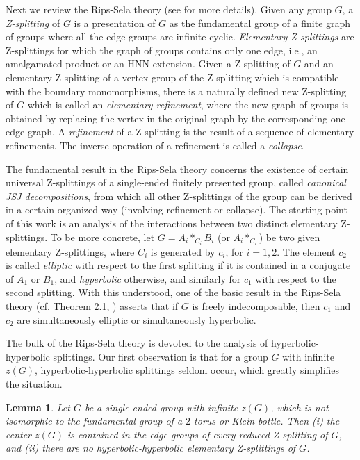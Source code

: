 \documentclass[11pt]{amsart}
\theoremstyle{plain}
\numberwithin{theorem}{section}
\newtheorem{lemma}[theorem]{Lemma}
\theoremstyle{definition}
\begin{document}
Next we review the Rips-Sela theory (see \cite{RipS} for more details). Given any group $G$,
a {\it Z-splitting} of $G$ is a presentation of $G$ as the fundamental group of a finite graph
of groups where all the edge groups are infinite cyclic. {\it Elementary Z-splittings} are
Z-splittings for which the graph of groups contains only one edge, i.e., an amalgamated 
product or an HNN extension. Given a Z-splitting of $G$ and an elementary Z-splitting of
a vertex group of the Z-splitting which is compatible with the boundary monomorphisms, there is a
naturally defined new Z-splitting of $G$ which is called an {\it elementary refinement}, where
the new graph of groups is obtained by replacing the vertex in the original graph by the 
corresponding one edge graph.  A {\it refinement} of a Z-splitting is the result of a sequence 
of elementary refinements. The inverse operation of a refinement is called a {\it collapse}. 

The fundamental result in the Rips-Sela theory concerns the existence of certain universal 
Z-splittings of a single-ended finitely presented group, called {\it canonical JSJ decompositions}, 
from which all other Z-splittings of the group can be derived in a certain organized way (involving
refinement or collapse). 
The starting point of this work is an analysis of the interactions between two distinct elementary 
Z-splittings. To be more concrete, let $G=A_i\ast_{C_i} B_i$ (or $A_i\ast_{C_i}$) be two given 
elementary Z-splittings, where $C_i$ is generated by $c_i$, for $i=1,2$. The element $c_2$ is 
called {\it elliptic} with respect to the first splitting if it is contained in a conjugate of $A_1$ or $B_1$, 
and {\it hyperbolic} otherwise, and similarly for $c_1$ with respect to the second splitting. With this
understood, one of the basic result in the Rips-Sela theory (cf. Theorem 2.1, \cite{RipS}) asserts 
that if $G$ is freely indecomposable, then $c_1$ and $c_2$ are simultaneously elliptic or 
simultaneously hyperbolic. 

The bulk of the Rips-Sela theory is devoted to the analysis of hyperbolic-hyperbolic splittings.
Our first observation is that for a group $G$ with infinite $z(G)$, hyperbolic-hyperbolic splittings
seldom occur, which greatly simplifies the situation. 

\begin{lemma}
Let $G$ be a single-ended group with infinite $z(G)$, which is not isomorphic to the fundamental
group of a $2$-torus or Klein bottle. Then (i) the center $z(G)$ is contained in the edge groups of
every reduced Z-splitting of $G$, and (ii) there are no hyperbolic-hyperbolic elementary Z-splittings 
of $G$.
\end{lemma}
\end{document}
